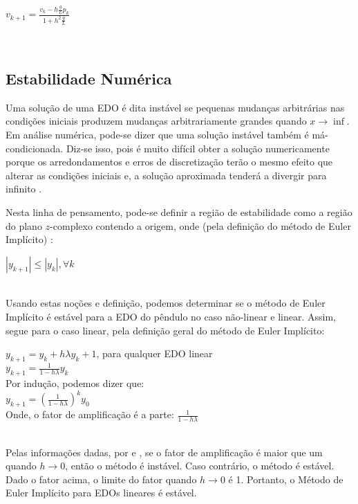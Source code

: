 \documentclass{amsart}
\theoremstyle{definition}
\theoremstyle{remark}
\numberwithin{equation}{section}
\begin{document}
\begin{flushleft}
$v_{k+1}=\frac{v_k - h\frac{g}{L}p_k}{1+h^2\frac{g}{L}}$ \\
\end{flushleft} \ \\

\subsection{Estabilidade Numérica}
Uma solução de uma EDO é dita instável se pequenas mudanças arbitrárias nas condições iniciais produzem mudanças arbitrariamente grandes quando $x \rightarrow \inf$. Em análise numérica, pode-se dizer que uma solução instável também é má-condicionada. Diz-se isso, pois é muito difícil obter a solução numericamente porque os arredondamentos e erros de discretização terão o mesmo efeito que alterar as condições iniciais e, a solução aproximada tenderá a divergir para infinito \cite{A}.

Nesta linha de pensamento, pode-se definir a região de estabilidade como a região do plano $z$-complexo contendo a origem, onde (pela definição do método de Euler Implícito) \cite{B}: \\

\begin{flushleft}
$|y_{k+1}| \leq |y_k|, \forall k$ \\
\end{flushleft} \ \\

Usando estas noções e definição, podemos determinar se o método de Euler Implícito é estável para a EDO do pêndulo no caso não-linear e linear. Assim, segue para o caso linear, pela definição geral do método de Euler Implícito: \\

\begin{flushleft}
$y_{k+1}=y_k + h\lambda y_k+1$, para qualquer EDO linear \\
$y_{k+1} = \frac{1}{1-h\lambda}y_k$ \\
Por indução, podemos dizer que: \\
$y_{k+1} = (\frac{1}{1-h\lambda})^k y_0$ \\
Onde, o fator de amplificação é a parte: $\frac{1}{1-h\lambda}$
\end{flushleft} \ \\

Pelas informações dadas, por \cite{A} e \cite{B}, se o fator de amplificação é maior que um quando $h \rightarrow 0$, então o método é instável. Caso contrário, o método é estável. Dado o fator acima, o limite do fator quando $h \rightarrow 0$ é 1. Portanto, o Método de Euler Implícito para EDOs lineares é estável. \\
\end{document}
